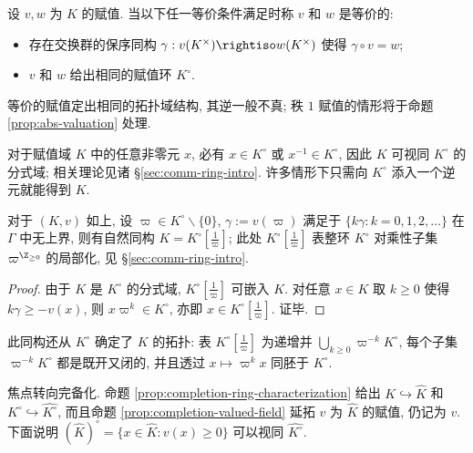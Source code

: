 \begin{definition}\label{def:valuation-equiv}
	设 $v, w$ 为 $K$ 的赋值. 当以下任一等价条件满足时称 $v$ 和 $w$ 是等价的:
	\begin{itemize}
		\item 存在交换群的保序同构 $\gamma: v(K^\times) \rightiso w(K^\times)$ 使得 $\gamma \circ v = w$;
		\item $v$ 和 $w$ 给出相同的赋值环 $K^\circ$.
	\end{itemize}
\end{definition}
等价的赋值定出相同的拓扑域结构, 其逆一般不真; 秩 $1$ 赋值的情形将于命题 \ref{prop:abs-valuation} 处理.


对于赋值域 $K$ 中的任意非零元 $x$, 必有 $x \in K^\circ$ 或 $x^{-1} \in K^\circ$, 因此 $K$ 可视同 $K^\circ$ 的分式域; 相关理论见诸 \S\ref{sec:comm-ring-intro}. 许多情形下只需向 $K^\circ$ 添入一个逆元就能得到 $K$.

\begin{lemma}\label{prop:valuation-localization}
	对于 $(K, v)$ 如上, 设 $\varpi \in K^\circ \smallsetminus \{0\}$, $\gamma := v(\varpi)$ 满足于 $\{ k\gamma : k=0,1,2,\ldots \}$ 在 $\Gamma$ 中无上界, 则有自然同构 $K = K^\circ[\frac{1}{\varpi}]$; 此处 $K^\circ[\frac{1}{\varpi}]$ 表整环 $K^\circ$ 对乘性子集 $\varpi^{\Z_{\geq 0}}$ 的局部化, 见 \S\ref{sec:comm-ring-intro}.
\end{lemma}
\begin{proof}
	由于 $K$ 是 $K^\circ$ 的分式域, $K^\circ[\frac{1}{\varpi}]$ 可嵌入 $K$. 对任意 $x \in K$ 取 $k \geq 0$ 使得 $k\gamma \geq -v(x)$, 则 $x \varpi^k \in K^\circ$, 亦即 $x \in K^\circ[\frac{1}{\varpi}]$. 证毕.
\end{proof}
此同构还从 $K^\circ$ 确定了 $K$ 的拓扑: 表 $K^\circ[\frac{1}{\varpi}]$ 为递增并 $\bigcup_{k \geq 0} \varpi^{-k} K^\circ$, 每个子集 $\varpi^{-k} K^\circ$ 都是既开又闭的, 并且透过 $x \mapsto \varpi^k x$ 同胚于 $K^\circ$.

焦点转向完备化. 命题 \ref{prop:completion-ring-characterization} 给出 $K \hookrightarrow \hat{K}$ 和 $K^\circ \hookrightarrow \widehat{K^\circ}$, 而且命题 \ref{prop:completion-valued-field} 延拓 $v$ 为 $\hat{K}$ 的赋值, 仍记为 $v$. 下面说明 $(\hat{K})^\circ = \{ x \in \hat{K}: v(x) \geq 0 \} $ 可以视同 $\widehat{K^\circ}$.

